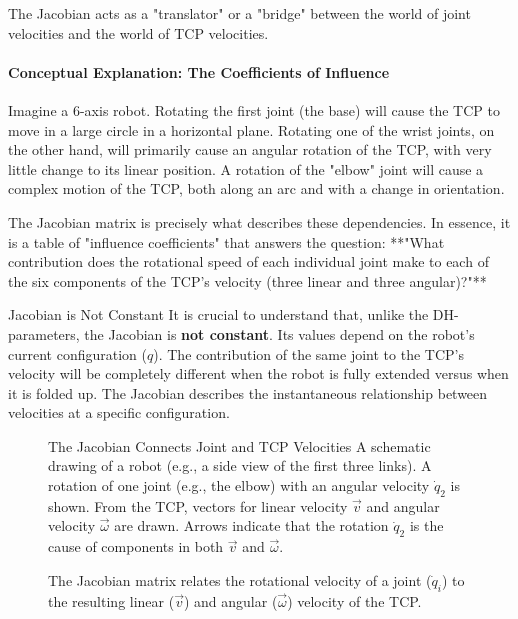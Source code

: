 The Jacobian acts as a "translator" or a "bridge" between the world of joint velocities and the world of TCP velocities.

\paragraph{Conceptual Explanation: The Coefficients of Influence}
Imagine a 6-axis robot. Rotating the first joint (the base) will cause the TCP to move in a large circle in a horizontal plane. Rotating one of the wrist joints, on the other hand, will primarily cause an angular rotation of the TCP, with very little change to its linear position. A rotation of the "elbow" joint will cause a complex motion of the TCP, both along an arc and with a change in orientation.

The Jacobian matrix is precisely what describes these dependencies. In essence, it is a table of "influence coefficients" that answers the question: **"What contribution does the rotational speed of each individual joint make to each of the six components of the TCP's velocity (three linear and three angular)?"**

\begin{tipbox}{Jacobian is Not Constant}
It is crucial to understand that, unlike the DH-parameters, the Jacobian is \textbf{not constant}. Its values depend on the robot's current configuration ($q$). The contribution of the same joint to the TCP's velocity will be completely different when the robot is fully extended versus when it is folded up. The Jacobian describes the instantaneous relationship between velocities at a specific configuration.
\end{tipbox}

\begin{figure}[h!]
    \centering
    \begin{infobox}{The Jacobian Connects Joint and TCP Velocities}
        A schematic drawing of a robot (e.g., a side view of the first three links). A rotation of one joint (e.g., the elbow) with an angular velocity $\dot{q}_2$ is shown. From the TCP, vectors for linear velocity $\vec{v}$ and angular velocity $\vec{\omega}$ are drawn. Arrows indicate that the rotation $\dot{q}_2$ is the cause of components in both $\vec{v}$ and $\vec{\omega}$.
    \end{infobox}
    \caption{The Jacobian matrix relates the rotational velocity of a joint ($\dot{q}_i$) to the resulting linear ($\vec{v}$) and angular ($\vec{\omega}$) velocity of the TCP.}
    \label{fig:jacobian_concept}
\end{figure}

